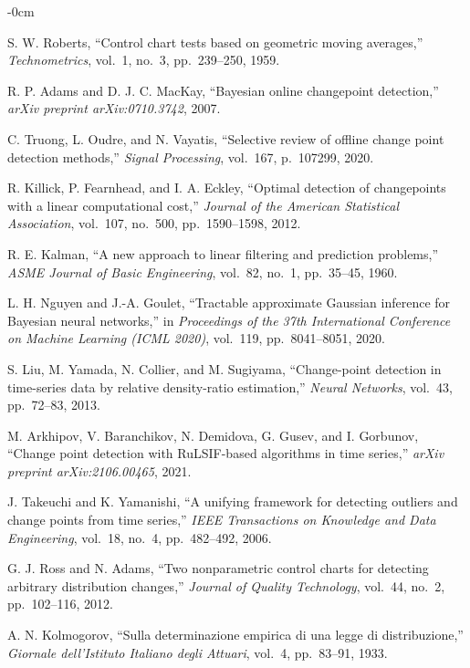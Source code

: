 \documentclass[journal,article,submit,pdftex,moreauthors]{Definitions/mdpi}
\begin{document}
\begin{adjustwidth}{-\extralength}{0cm}
\begin{thebibliography}{999}
S. W. Roberts, ``Control chart tests based on geometric moving averages,'' \textit{Technometrics}, vol.~1, no.~3, pp.~239--250, 1959.

R. P. Adams and D. J. C. MacKay, ``Bayesian online changepoint detection,'' \textit{arXiv preprint arXiv:0710.3742}, 2007.

C. Truong, L. Oudre, and N. Vayatis, ``Selective review of offline change point detection methods,'' \textit{Signal Processing}, vol.~167, p.~107299, 2020.

R. Killick, P. Fearnhead, and I. A. Eckley, ``Optimal detection of changepoints with a linear computational cost,'' \textit{Journal of the American Statistical Association}, vol.~107, no.~500, pp.~1590--1598, 2012.

R. E. Kalman, ``A new approach to linear filtering and prediction problems,'' \textit{ASME Journal of Basic Engineering}, vol.~82, no.~1, pp.~35--45, 1960.

L. H. Nguyen and J.-A. Goulet, ``Tractable approximate Gaussian inference for Bayesian neural networks,'' in \textit{Proceedings of the 37th International Conference on Machine Learning (ICML 2020)}, vol.~119, pp.~8041--8051, 2020.

S. Liu, M. Yamada, N. Collier, and M. Sugiyama, ``Change-point detection in time-series data by relative density-ratio estimation,'' \textit{Neural Networks}, vol.~43, pp.~72--83, 2013.

M. Arkhipov, V. Baranchikov, N. Demidova, G. Gusev, and I. Gorbunov, ``Change point detection with RuLSIF-based algorithms in time series,'' \textit{arXiv preprint arXiv:2106.00465}, 2021.

J. Takeuchi and K. Yamanishi, ``A unifying framework for detecting outliers and change points from time series,'' \textit{IEEE Transactions on Knowledge and Data Engineering}, vol.~18, no.~4, pp.~482--492, 2006.

G. J. Ross and N. Adams, ``Two nonparametric control charts for detecting arbitrary distribution changes,'' \textit{Journal of Quality Technology}, vol.~44, no.~2, pp.~102--116, 2012.

A. N. Kolmogorov, ``Sulla determinazione empirica di una legge di distribuzione,'' \textit{Giornale dell’Istituto Italiano degli Attuari}, vol.~4, pp.~83--91, 1933.


\end{thebibliography}
\end{adjustwidth}
\end{document}
